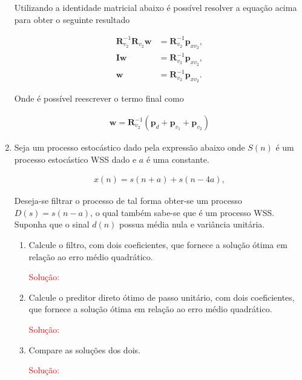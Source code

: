 \documentclass[a4paper,10pt]{article}
\begin{document}
\begin{enumerate}
				Utilizando a identidade matricial abaixo é possível resolver a equação acima para obter o seguinte resultado
				
				\begin{align}
					\mathbf{R}^{-1}_{v_{2}}\mathbf{R}_{v_{2}} \mathbf{w} &= \mathbf{R}^{-1}_{v_{2}}\mathbf{p}_{xv_{2}}, \\
					\mathbf{I}\mathbf{w} &= \mathbf{R}^{-1}_{v_{2}}\mathbf{p}_{xv_{2}}, \\ 
					\mathbf{w} &= \mathbf{R}^{-1}_{v_{2}}\mathbf{p}_{xv_{2}}. 
				\end{align}
				
				Onde é possível reescrever o termo final como
				
				\begin{align}
					\mathbf{w} = \mathbf{R}^{-1}_{v_{2}}(\mathbf{p}_{d} + \mathbf{p}_{v_{1}} + \mathbf{p}_{v_{2}}) 
				\end{align}
			
			\item Seja um processo estocástico dado pela expressão abaixo onde $S(n)$ é um processo estocástico WSS dado e $a$ é uma constante.
			
				\begin{align*}
					x(n) = s(n + a) + s(n-4a),
				\end{align*}
				
				Deseja-se filtrar o processo de tal forma obter-se um processo $D(s) = s(n -a)$, o qual também sabe-se que é um processo WSS. Suponha que o sinal $d(n)$ possua média nula e variância unitária.
			
				\begin{enumerate}
					
					\item Calcule o filtro, com dois coeficientes, que fornece a solução ótima em relação ao erro médio quadrático.
					
						\textcolor{red}{Solução:}
					
					\item Calcule o preditor direto ótimo de passo unitário, com dois coeficientes, que fornece a solução ótima em relação ao erro médio quadrático.
					
						\textcolor{red}{Solução:}
					
					\item Compare as soluções dos dois.
					
						\textcolor{red}{Solução:}
					
				\end{enumerate}
			

\end{enumerate}
\end{document}
